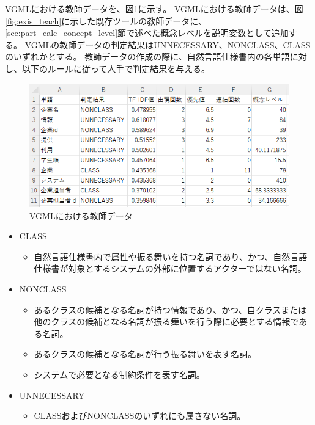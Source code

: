 VGMLにおける教師データを、図\ref{fig:vgml_teach}に示す。
VGMLにおける教師データは、図\ref{fig:exis_teach}に示した既存ツールの教師データに、\ref{sec:part_calc_concept_level}節で述べた概念レベルを説明変数として追加する。
VGMLの教師データの判定結果はUNNECESSARY、NONCLASS、CLASSのいずれかとする。
教師データの作成の際に、自然言語仕様書内の各単語に対し、以下のルールに従って人手で判定結果を与える。

\begin{figure}[t]
    \begin{center}
        \includegraphics[width=1.0\columnwidth]{image/vgml_teach.png}
        \caption{VGMLにおける教師データ}
        \label{fig:vgml_teach}
    \end{center}
\end{figure}

\begin{itemize}
    \item CLASS
        \begin{itemize}
            \item 自然言語仕様書内で属性や振る舞いを持つ名詞であり、かつ、自然言語仕様書が対象とするシステムの外部に位置するアクターではない名詞。
        \end{itemize}
    \item NONCLASS
        \begin{itemize}
            \item あるクラスの候補となる名詞が持つ情報であり、かつ、自クラスまたは他のクラスの候補となる名詞が振る舞いを行う際に必要とする情報である名詞。
            \item あるクラスの候補となる名詞が行う振る舞いを表す名詞。
            \item システムで必要となる制約条件を表す名詞。
        \end{itemize}
    \item UNNECESSARY
        \begin{itemize}
            \item CLASSおよびNONCLASSのいずれにも属さない名詞。
        \end{itemize}
\end{itemize}

